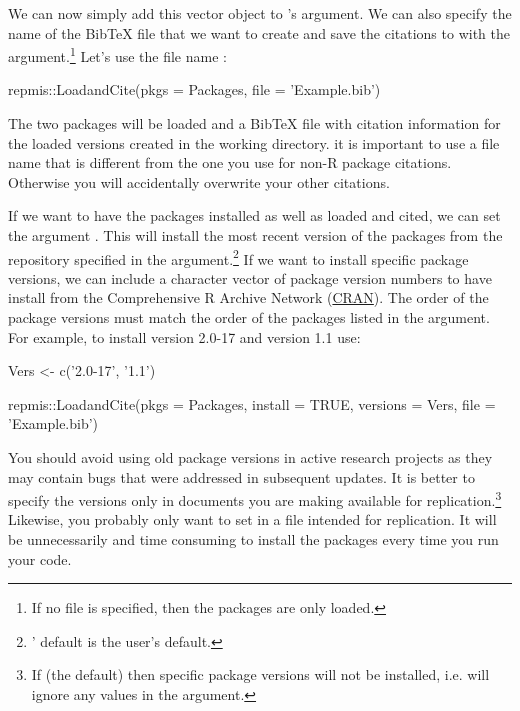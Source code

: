\noindent We can now simply add this vector object to 's  argument. We can also specify the name of the BibTeX file that we want to create and save the citations to with the  argument.\footnote{If no file is specified, then the packages are only loaded.} Let's use the file name :

\begin{example}
  repmis::LoadandCite(pkgs = Packages, file = 'Example.bib')
\end{example}

\noindent The two packages will be loaded and a BibTeX file with citation information for the loaded versions created in the working directory.  it is important to use a file name that is different from the one you use for non-R package citations. Otherwise you will accidentally overwrite your other citations.

If we want to have the packages installed as well as loaded and cited, we can set the argument . This will install the most recent version of the packages from the repository specified in the  argument.\footnote{' default is the user's default.} If we want to install specific package versions, we can include a character vector of package version numbers to have  install from the Comprehensive R Archive Network (\href{http://cran.r-project.org/}{CRAN}). The order of the package versions must match the order of the packages listed in the  argument. For example, to install  version 2.0-17 and  version 1.1 use:

\begin{example}
  Vers <- c('2.0-17', '1.1')

  repmis::LoadandCite(pkgs = Packages, install = TRUE,
                      versions = Vers, file = 'Example.bib')
\end{example}


\noindent You should avoid using old package versions in active research projects as they may contain bugs that were addressed in subsequent updates. It is better to specify the versions only in documents you are making available for replication.\footnote{If  (the default) then specific package versions will not be installed, i.e.  will ignore any values in the  argument.} Likewise, you probably only want to set  in a file intended for replication. It will be unnecessarily and time consuming to install the packages every time you run your code.

